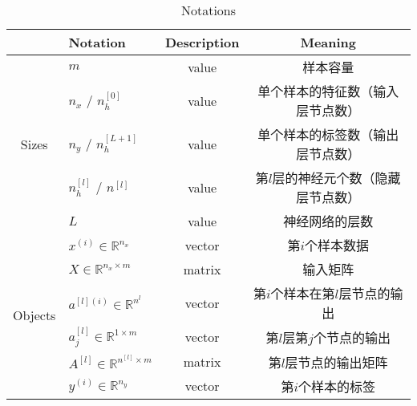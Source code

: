 \begin{table}[ht]
	\centering
	\begin{threeparttable}
	\caption{Notations}
	\begin{tabular}{clcc}
		\hline
									& \textbf{Notation}                                     & \textbf{Description} & \textbf{Meaning}                                                   \\ \hline
		\multirow{5}{*}{Sizes}      & $m$                                                   & value                & 样本容量                                                               \\
									& $n_x$ / $n_h^{[0]}$                                   & value                & 单个样本的特征数（输入层节点数）                                         \\
									& $n_y$ / $n_h^{[L+1]}$                                 & value                & 单个样本的标签数（输出层节点数）                                      \\
									& $n_h^{[l]}$ / $n^{[l]}$                               & value                & 第$l$层的神经元个数（隐藏层节点数）                                   \\
									& $L$                                                   & value                & 神经网络的层数                                                         \\ \hline
		\multirow{11}{*}{Objects}   & $x^{(i)} \in \mathbb{R}^{n_x}$                        & vector               & 第$i$个样本数据                                                          \\
									& $X \in {\mathbb{R}^{n_x \times m}}$                   & matrix               & 输入矩阵                                                               \\
									& $a^{[l](i)} \in \mathbb{R}^{n^{l}}$                   & vector               & 第$i$个样本在第$l$层节点的输出                                                  \\
									& $a_j^{[l]} \in \mathbb{R}^{1 \times {m}}$             & vector               & 第$l$层第$j$个节点的输出                                                         \\
									& $A^{[l]} \in \mathbb{R}^{n^{[l]} \times {m}}$         & matrix               & 第$l$层节点的输出矩阵                                                         \\
									& $y^{(i)} \in \mathbb{R}^{n_y}$                        & vector               & 第$i$个样本的标签                                                         \\

\end{tabular}
\end{threeparttable}
\end{table}
